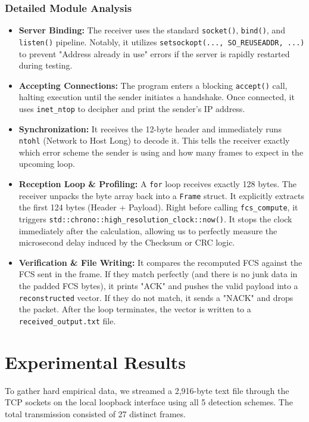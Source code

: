\documentclass[12pt, a4paper]{article}
\begin{document}
\subsubsection{Detailed Module Analysis}
\begin{itemize}
    \item \textbf{Server Binding:} The receiver uses the standard \texttt{socket()}, \texttt{bind()}, and \texttt{listen()} pipeline. Notably, it utilizes \texttt{setsockopt(..., SO\_REUSEADDR, ...)} to prevent "Address already in use" errors if the server is rapidly restarted during testing. 
    \item \textbf{Accepting Connections:} The program enters a blocking \texttt{accept()} call, halting execution until the sender initiates a handshake. Once connected, it uses \texttt{inet\_ntop} to decipher and print the sender's IP address.
    \item \textbf{Synchronization:} It receives the 12-byte header and immediately runs \texttt{ntohl} (Network to Host Long) to decode it. This tells the receiver exactly which error scheme the sender is using and how many frames to expect in the upcoming loop.
    \item \textbf{Reception Loop \& Profiling:} A \texttt{for} loop receives exactly 128 bytes. The receiver unpacks the byte array back into a \texttt{Frame} struct. It explicitly extracts the first 124 bytes (Header + Payload). Right before calling \texttt{fcs\_compute}, it triggers \texttt{std::chrono::high\_resolution\_clock::now()}. It stops the clock immediately after the calculation, allowing us to perfectly measure the microsecond delay induced by the Checksum or CRC logic.
    \item \textbf{Verification \& File Writing:} It compares the recomputed FCS against the FCS sent in the frame. If they match perfectly (and there is no junk data in the padded FCS bytes), it prints "ACK" and pushes the valid payload into a \texttt{reconstructed} vector. If they do not match, it sends a "NACK" and drops the packet. After the loop terminates, the vector is written to a \texttt{received\_output.txt} file. 
\end{itemize}

\section{Experimental Results}



To gather hard empirical data, we streamed a 2,916-byte text file through the TCP sockets on the local loopback interface using all 5 detection schemes. The total transmission consisted of 27 distinct frames.
\end{document}
